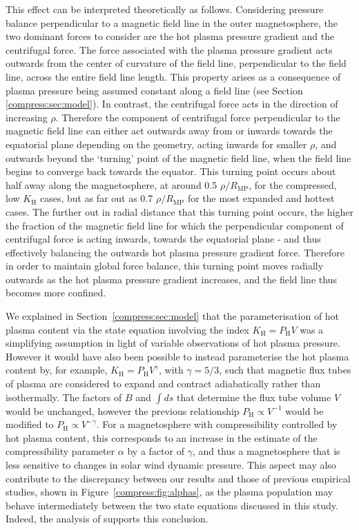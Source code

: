 This effect can be interpreted theoretically as follows. Considering pressure balance perpendicular to a magnetic field line in the outer magnetosphere, the two dominant forces to consider are the hot plasma pressure gradient and the centrifugal force. The force associated with the plasma pressure gradient acts outwards from the center of curvature of the field line, perpendicular to the field line, across the entire field line length. This property arises as a consequence of plasma pressure being assumed constant along a field line (see Section \ref{compress:sec:model}). In contrast, the centrifugal force acts in the direction of increasing $\rho$. Therefore the component of centrifugal force perpendicular to the magnetic field line can either act outwards away from or inwards towards the equatorial plane depending on the geometry, acting inwards for smaller $\rho$, and outwards beyond the `turning' point of the magnetic field line, when the field line begins to converge back towards the equator. This turning point occurs about half away along the magnetosphere, at around 0.5 $\rho/R_\mathrm{MP}$, for the compressed, low $K_\mathrm{H}$ cases, but as far out as 0.7 $\rho/R_\mathrm{MP}$ for the most expanded and hottest cases. The further out in radial distance that this turning point occurs, the higher the fraction of the magnetic field line for which the perpendicular component of centrifugal force is acting inwards, towards the equatorial plane - and thus effectively balancing the outwards hot plasma pressure gradient force. Therefore in order to maintain global force balance, this turning point moves radially outwards as the hot plasma pressure gradient increases, and the field line thus becomes more confined.

We explained in Section~\ref{compress:sec:model} that the parameterisation of hot plasma content via the state equation involving the index $K_\mathrm{H}=P_\mathrm{H}V$ was a simplifying assumption in light of variable observations of hot plasma pressure. However it would have also been possible to instead parameterise the hot plasma content by, for example, $K_\mathrm{H}=P_\mathrm{H}V^\gamma$, with $\gamma=5/3$, such that magnetic flux tubes of plasma are considered to expand and contract adiabatically rather than isothermally. The factors of $B$ and $\int ds$ that determine the flux tube volume $V$ would be unchanged, however the previous relationship $P_\mathrm{H}\propto V^{-1}$ would be modified to $P_\mathrm{H} \propto V^{-\gamma}$. For a magnetosphere with compressibility controlled by hot plasma content, this corresponds to an increase in the estimate of the compressibility parameter $\alpha$ by a factor of $\gamma$, and thus a magnetosphere that is less sensitive to changes in solar wind dynamic pressure. This aspect may also contribute to the discrepancy between our results and those of previous empirical studies, shown in Figure~\ref{compress:fig:alphas}, as the plasma population may behave intermediately between the two state equations discussed in this study. Indeed, the analysis of \citet{achilleos2010a} supports this conclusion.

